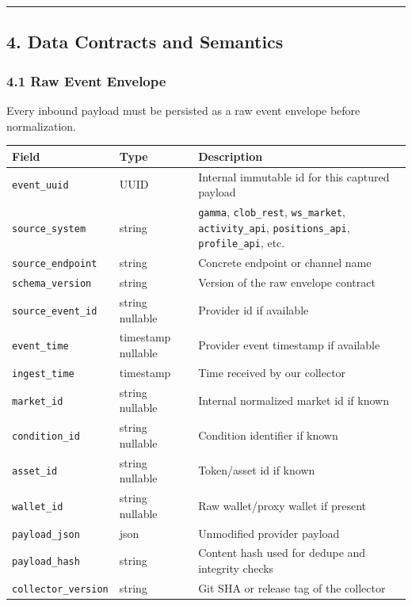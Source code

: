 \documentclass[
]{article}
\newcounter{none} %
\begin{document}
\begin{center}\rule{0.5\linewidth}{0.5pt}\end{center}

\subsection{4. Data Contracts and
Semantics}\label{4-data-contracts-and-semantics}

\subsubsection{4.1 Raw Event Envelope}\label{41-raw-event-envelope}

Every inbound payload must be persisted as a raw event envelope before
normalization.

{\def\LTcaptype{none} %
\begin{longtable}[]{@{}lll@{}}
\toprule\noalign{}
Field & Type & Description \\
\midrule\noalign{}
\endhead
\bottomrule\noalign{}
\endlastfoot
\texttt{event\_uuid} & UUID & Internal immutable id for this captured
payload \\
\texttt{source\_system} & string & \texttt{gamma}, \texttt{clob\_rest},
\texttt{ws\_market}, \texttt{activity\_api}, \texttt{positions\_api},
\texttt{profile\_api}, etc. \\
\texttt{source\_endpoint} & string & Concrete endpoint or channel
name \\
\texttt{schema\_version} & string & Version of the raw envelope
contract \\
\texttt{source\_event\_id} & string nullable & Provider id if
available \\
\texttt{event\_time} & timestamp nullable & Provider event timestamp if
available \\
\texttt{ingest\_time} & timestamp & Time received by our collector \\
\texttt{market\_id} & string nullable & Internal normalized market id if
known \\
\texttt{condition\_id} & string nullable & Condition identifier if
known \\
\texttt{asset\_id} & string nullable & Token/asset id if known \\
\texttt{wallet\_id} & string nullable & Raw wallet/proxy wallet if
present \\
\texttt{payload\_json} & json & Unmodified provider payload \\
\texttt{payload\_hash} & string & Content hash used for dedupe and
integrity checks \\
\texttt{collector\_version} & string & Git SHA or release tag of the
collector \\
\end{longtable}
}
\end{document}
